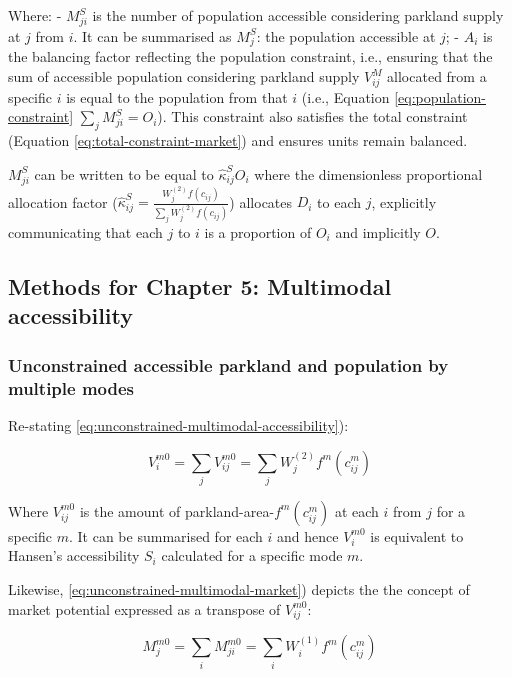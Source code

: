 \documentclass[
11pt, %
oneside, %
english, %
singlespacing, %
]{macthesis} %
\begin{document}
Where:
- \(M^S_{ji}\) is the number of population accessible considering parkland supply at \(j\) from \(i\). It can be summarised as \(M^S_{j}\): the population accessible at \(j\);
- \(A_i\) is the balancing factor reflecting the population constraint, i.e., ensuring that the sum of accessible population considering parkland supply \(V^M_{ij}\) allocated from a specific \(i\) is equal to the population from that \(i\) (i.e., Equation \ref{eq:population-constraint} \(\sum_j M^S_{ji} =  O_i\)). This constraint also satisfies the total constraint (Equation \ref{eq:total-constraint-market}) and ensures units remain balanced.

\(M_{ji}^S\) can be written to be equal to \(\hat \kappa_{ij}^S O_i\) where the dimensionless proportional allocation factor (\(\hat \kappa_{ij}^S = \frac{W_j^{(2)} f(c_{ij})}{\sum_j W_j^{(2)} f(c_{ij})}\)) allocates \(D_i\) to each \(j\), explicitly communicating that each \(j\) to \(i\) is a proportion of \(O_i\) and implicitly \(O\).

\subsection{Methods for Chapter 5: Multimodal accessibility}\label{methods-for-chapter-5-multimodal-accessibility}

\subsubsection{Unconstrained accessible parkland and population by multiple modes}\label{unconstrained-accessible-parkland-and-population-by-multiple-modes}

Re-stating \ref{eq:unconstrained-multimodal-accessibility}):

\begin{equation}
\label{eq:unconstrained-multimodal-accessibility}
V^{m0}_{i} = \sum_j V^{m0}_{ij} = \sum_j W_j^{(2)} f^m(c^m_{ij})
\end{equation} 

Where \(V^{m0}_{ij}\) is the amount of parkland-area-\(f^{m}(c^{m}_{ij})\) at each \(i\) from \(j\) for a specific \(m\). It can be summarised for each \(i\) and hence \(V^{m0}_i\) is equivalent to Hansen's accessibility \(S_i\) calculated for a specific mode \(m\).

Likewise, \ref{eq:unconstrained-multimodal-market}) depicts the the concept of market potential expressed as a transpose of \(V^{m0}_{ij}\):

\begin{equation}
\label{eq:unconstrained-multimodal-market}
M_j^{m0} = \sum_i M^{m0}_{ji} = \sum_i W_i^{(1)} f^m(c^m_{ij})
\end{equation} 
\end{document}
